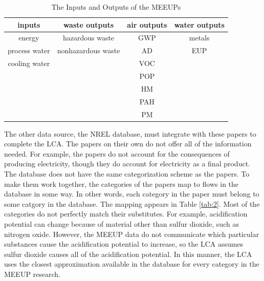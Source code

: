 \documentclass[final,journal,10pt,letterpaper,oneside,twocolumn,compsoc]%
{IEEEtran}
\begin{document}
\begin{table}[t!]
\caption{The Inputs and Outputs of the MEEUPs}
\centering
\begin{tabular}{|c|*{2}{c|}c|}
  \hline
  inputs        & waste outputs       & air outputs & water outputs \\
  \hline
  energy        & hazardous waste     & GWP         & metals \\
  process water & nonhazardous waste & AD          & EUP \\
  cooling water &                     & VOC         &  \\
                &                     & POP         &  \\
                &                     & HM          &  \\
                &                     & PAH         &  \\
                &                     & PM          &  \\
  \hline
\end{tabular}
\label{tab:1}
\end{table}

The other data source, the NREL database, must integrate with these papers to
complete the LCA. The papers on their own do not offer all of the information
needed. For example, the papers do not account for the consequences of producing
electricity, though they do account for electricity as a final product. The
database does not have the same categorization scheme as the papers. To make
them
work together, the categories of the papers map to flows in the database in some
way. In other words, each category in the paper must belong to some catgory in
the database. The
mapping appears in Table \ref{tab:2}. Most of the categories do not perfectly
match their substitutes. For example, acidification potential can change because
of
material other than sulfur dioxide, such as nitrogen oxide. However, the MEEUP
data do not communicate which particular substances cause the acidification
potential to increase, so the LCA assumes sulfur dioxide causes all of the
acidification potential. In this manner,
the LCA uses the closest approximation available in the database for every
category in the MEEUP research.
\end{document}
